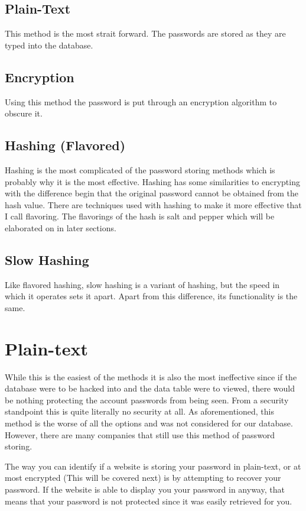 \documentclass[12pt]{article}
\begin{document}
\subsection {\indent Plain-Text}
This method is the most strait forward. The passwords are stored as they are typed into the database. 


\subsection{\indent Encryption}
Using this method the password is put through an encryption algorithm to obscure it. 

\subsection{\indent Hashing (Flavored)}
Hashing is the most complicated of the password storing methods which is probably why it is the most effective. Hashing has some similarities to encrypting with the difference begin that the original password cannot be obtained from the hash value. There are techniques used with hashing to make it more effective that I call flavoring. The flavorings of the hash is salt and pepper which will be elaborated on in later sections. 

\subsection{\indent Slow Hashing}
Like flavored hashing, slow hashing is a variant of hashing, but the speed in which it operates sets it apart. Apart from this difference, its functionality is the same. 

\section{Plain-text}
While this is the easiest of the methods it is also the most ineffective since if the database were to be hacked into and the data table were to viewed, there would be nothing protecting the account passwords from being seen. From a security standpoint this is quite literally no security at all. As aforementioned, this method is the worse of all the options and was not considered for our database. However, there are many companies that still use this method of password storing.

The way you can identify if a website is storing your password in plain-text, or at most encrypted (This will be covered next) is by attempting to recover your password. If the website is able to display you your password in anyway, that means that your password is not protected since it was easily retrieved for you. 
\end{document}
